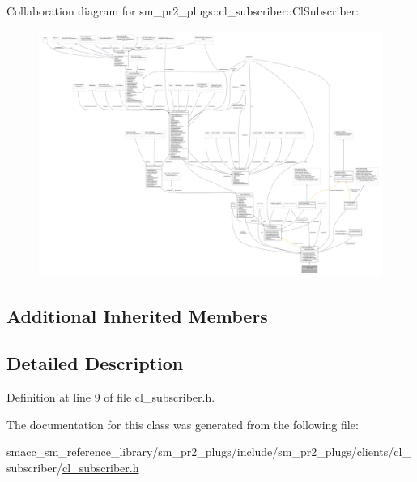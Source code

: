 Collaboration diagram for sm\+\_\+pr2\+\_\+plugs\+:\+:cl\+\_\+subscriber\+:\+:Cl\+Subscriber\+:
\nopagebreak
\begin{figure}[H]
\begin{center}
\leavevmode
\includegraphics[width=350pt]{classsm__pr2__plugs_1_1cl__subscriber_1_1ClSubscriber__coll__graph}
\end{center}
\end{figure}
\subsection*{Additional Inherited Members}


\subsection{Detailed Description}


Definition at line 9 of file cl\+\_\+subscriber.\+h.



The documentation for this class was generated from the following file\+:\begin{DoxyCompactItemize}
\item 
smacc\+\_\+sm\+\_\+reference\+\_\+library/sm\+\_\+pr2\+\_\+plugs/include/sm\+\_\+pr2\+\_\+plugs/clients/cl\+\_\+subscriber/\hyperlink{sm__pr2__plugs_2include_2sm__pr2__plugs_2clients_2cl__subscriber_2cl__subscriber_8h}{cl\+\_\+subscriber.\+h}\end{DoxyCompactItemize}
